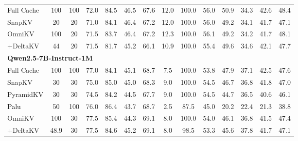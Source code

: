 \begin{table}[t]
{\begin{tabular}{l cc cccc ccc ccc c}
Full Cache & 100 & 100 & 72.0 & 84.5 & 46.5 & 67.6 & 12.0 & 100.0 & 56.0 & 50.9 & 34.3 & 42.6 & 48.4 \\
SnapKV & 20 & 20 & 71.0 & 84.1 & 46.4 & 67.2 & 12.0 & 100.0 & 56.0 & 49.2 & 34.1 & 41.7 & 47.1 \\
OmniKV & 100 & 20 & 71.5 & 83.7 & 46.4 & 67.2 & 12.3 & 100.0 & 56.1 & 49.2 & 34.2 & 41.7 & 48.1 \\
\quad +DeltaKV & 44 & 20 & 71.5 & 81.7 & 45.2 & 66.1 & 10.9 & 100.0 & 55.4 & 49.6 & 34.6 & 42.1 & 47.7 \\
\midrule
\multicolumn{14}{l}{\textbf{Qwen2.5-7B-Instruct-1M}} \\
Full Cache & 100 & 100 & 77.0 & 84.1 & 45.1 & 68.7 & 7.5 & 100.0 & 53.8 & 47.9 & 37.1 & 42.5 & 47.6 \\
SnapKV & 30 & 30 & 75.0 & 85.0 & 45.0 & 68.3 & 9.0 & 100.0 & 54.5 & 46.7 & 36.8 & 41.8 & 47.0 \\
PyramidKV & 30 & 30 & 74.5 & 84.2 & 44.5 & 67.7 & 9.0 & 100.0 & 54.5 & 44.7 & 36.5 & 40.6 & 46.1 \\
Palu & 50 & 100 & 76.0 & 86.4 & 43.7 & 68.7 & 2.5 & 87.5 & 45.0 & 20.2 & 22.4 & 21.3 & 38.8 \\
OmniKV & 100 & 30 & 77.5 & 85.4 & 44.3 & 69.1 & 8.0 & 100.0 & 54.0 & 46.1 & 36.8 & 41.5 & 47.4 \\
\quad +DeltaKV & 48.9 & 30 & 77.5 & 84.6 & 45.2 & 69.1 & 8.0 & 98.5 & 53.3 & 45.6 & 37.8 & 41.7 & 47.1 \\
\bottomrule
\end{tabular}
}
\end{table}

\begin{table}[t]
\centering
\caption{Component-wise ablation study on Llama-3.1-8B-Instruct (Part 1).}
\label{tab:ablation}
\end{table}

